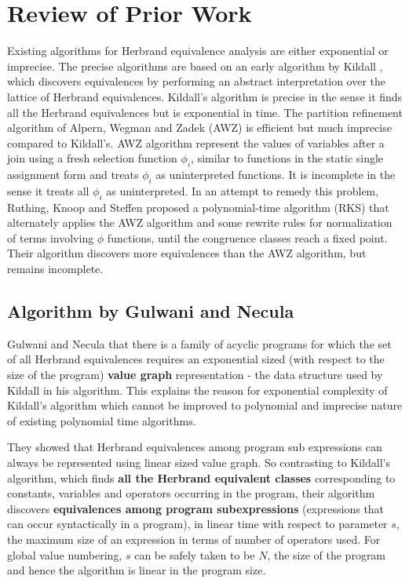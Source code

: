 \chapter{Review of Prior Work}
\label{chap:chapter2}

Existing algorithms for Herbrand equivalence analysis are either
exponential or imprecise. The precise algorithms are based on an 
early algorithm by Kildall \cite{Kildall}, which discovers 
equivalences by performing an abstract interpretation over the 
lattice of Herbrand equivalences. Kildall's algorithm is precise in 
the sense it finds all the Herbrand equivalences but is exponential 
in time. The partition refinement algorithm of Alpern, Wegman and 
Zadek (AWZ) \cite{AWZ} is efficient but much imprecise compared to 
Kildall's. AWZ algorithm represent the values of variables after a 
join using a fresh selection function $\phi_i$, similar to functions 
in the static single assignment form and treats $\phi_i$ as 
uninterpreted functions. It is incomplete in the sense it treats all 
$\phi_i$ as uninterpreted. In an attempt to remedy this problem, 
Ruthing, Knoop and Steffen proposed a polynomial-time algorithm (RKS) 
\cite{RKS} that alternately applies the AWZ algorithm and some 
rewrite rules for normalization of terms involving $\phi$ functions, 
until the congruence classes reach a fixed point. Their algorithm 
discovers more equivalences than the AWZ algorithm, but remains 
incomplete.

\section{Algorithm by Gulwani and Necula}
\label{sec:AlgorithmByGulwaniAndNecula}
Gulwani and Necula \cite{Gulwani} that there is a family of acyclic 
programs for which the set of all Herbrand equivalences requires an 
exponential sized (with respect to the size of the program) \textbf{value 
graph} representation - the data structure used by Kildall in his 
algorithm. This explains the reason for exponential complexity of 
Kildall's algorithm which cannot be improved to polynomial and imprecise 
nature of existing polynomial time algorithms.

They showed that Herbrand equivalences among program sub expressions 
can always be represented using linear sized value graph. 
So contrasting to Kildall's algorithm, which finds \textbf{all the 
Herbrand equivalent classes} corresponding to constants, variables 
and operators occurring in the program, their algorithm discovers 
\textbf{equivalences among program subexpressions} (expressions that 
can occur syntactically in a program), in linear time with respect to 
parameter $s$, the maximum size of an expression in terms of number 
of operators used. For global value numbering, $s$ can be safely 
taken to be $N$, the size of the program and hence the algorithm is 
linear in the program size.

